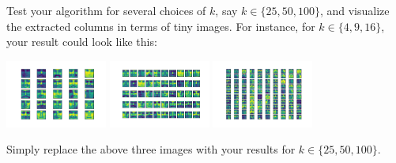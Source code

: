 Test your algorithm for several choices of $k$, say $k \in \{ 25, 50, 100 \}$, and visualize the extracted columns in terms of tiny images. For instance, for $k \in \{ 4, 9, 16 \}$, your result could look like this:
\begin{center}
\includegraphics[width=0.25\textwidth]{Ex_01/Figures/t1-4-k4.png} 
\quad
\includegraphics[width=0.25\textwidth]{Ex_01/Figures/t1-4-k9.png}
\quad
\includegraphics[width=0.25\textwidth]{Ex_01/Figures/t1-4-k16.png}
\end{center}
Simply replace the above three images with your results for $k \in \{25, 50, 100\}$.






